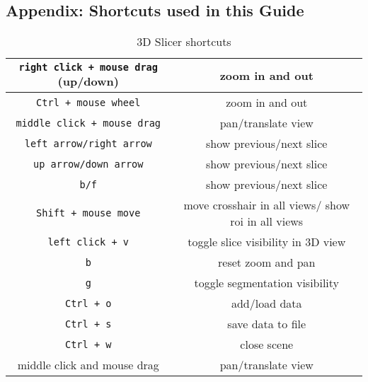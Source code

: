 \begin{appendix}
	\section{Appendix: Shortcuts used in this Guide}
	\begin{table}[!h]
		\begin{center}
			\caption{3D Slicer shortcuts}
			\label{table:shortcuts}
			\begin{tabular}{|c|c|}
				\hline
				\texttt{right click + mouse drag} (up/down) & zoom in and out                                          \\
				\hline
				\texttt{Ctrl + mouse wheel}                 & zoom in and out                                          \\
				\hline
				\texttt{middle click + mouse drag}          & pan/translate view                                       \\
				\hline
				\texttt{left arrow/right arrow}             & show previous/next slice                                 \\
				\hline
				\texttt{up arrow/down arrow}                & show previous/next slice                                 \\
				\hline
				\texttt{b/f}                                & show previous/next slice                                 \\
				\hline
				\texttt{Shift + mouse move}                 & move crosshair in all views/ show \gls{roi} in all views \\
				\hline
				\texttt{left click + v}                     & toggle slice visibility in 3D view                       \\
				\hline
				\texttt{b}                                  & reset zoom and pan                                       \\
				\hline
				\texttt{g}                                  & toggle segmentation visibility                           \\
				\hline
				\texttt{Ctrl + o}                           & add/load data                                            \\
				\hline
				\texttt{Ctrl + s}                           & save data to file                                        \\
				\hline
				\texttt{Ctrl + w}                           & close scene                                              \\
				\hline
				middle click and mouse drag                 & pan/translate view                                       \\

\end{tabular}
\end{center}
\end{table}
\end{appendix}

